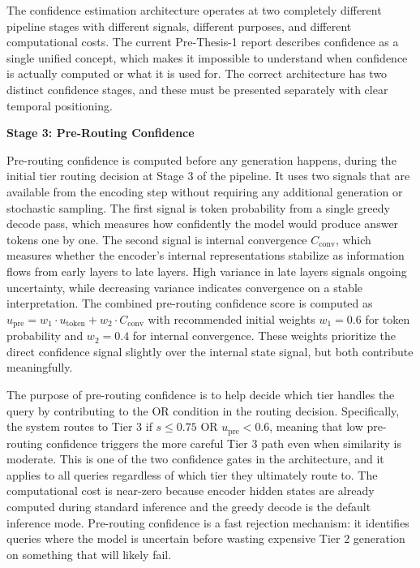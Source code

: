 \documentclass[11pt,a4paper]{article}
\newcommand{\architecturebox}[2]{%
\begin{tcolorbox}[enhanced,breakable,
  colback=LightTeal,colframe=Teal,boxrule=1.5pt,arc=4pt,
  left=8pt,right=8pt,top=6pt,bottom=6pt,
  title={\bfseries\small\color{white}#1},
  attach boxed title to top left={yshift=-2mm,xshift=6mm},
  boxed title style={colback=Teal,arc=3pt,boxrule=0pt,
    left=4pt,right=4pt,top=2pt,bottom=2pt}]
#2
\end{tcolorbox}}
\newcommand{\Cconv}{C_{\text{conv}}}
\newcommand{\upre}{u_{\text{pre}}}
\begin{document}
\architecturebox{ARCHITECTURE UPDATE 1: Two-Stage Confidence System}{
The confidence estimation architecture operates at two completely different pipeline stages with different signals, different purposes, and different computational costs. The current Pre-Thesis-1 report describes confidence as a single unified concept, which makes it impossible to understand when confidence is actually computed or what it is used for. The correct architecture has two distinct confidence stages, and these must be presented separately with clear temporal positioning.

\textbf{Stage 3: Pre-Routing Confidence}

Pre-routing confidence is computed before any generation happens, during the initial tier routing decision at Stage 3 of the pipeline. It uses two signals that are available from the encoding step without requiring any additional generation or stochastic sampling. The first signal is token probability from a single greedy decode pass, which measures how confidently the model would produce answer tokens one by one. The second signal is internal convergence $\Cconv$, which measures whether the encoder's internal representations stabilize as information flows from early layers to late layers. High variance in late layers signals ongoing uncertainty, while decreasing variance indicates convergence on a stable interpretation. The combined pre-routing confidence score is computed as $\upre = w_1 \cdot u_{\text{token}} + w_2 \cdot \Cconv$ with recommended initial weights $w_1 = 0.6$ for token probability and $w_2 = 0.4$ for internal convergence. These weights prioritize the direct confidence signal slightly over the internal state signal, but both contribute meaningfully.

The purpose of pre-routing confidence is to help decide which tier handles the query by contributing to the OR condition in the routing decision. Specifically, the system routes to Tier 3 if $s \leq 0.75$ OR $\upre < 0.6$, meaning that low pre-routing confidence triggers the more careful Tier 3 path even when similarity is moderate. This is one of the two confidence gates in the architecture, and it applies to all queries regardless of which tier they ultimately route to. The computational cost is near-zero because encoder hidden states are already computed during standard inference and the greedy decode is the default inference mode. Pre-routing confidence is a fast rejection mechanism: it identifies queries where the model is uncertain before wasting expensive Tier 2 generation on something that will likely fail.

}
\end{document}
